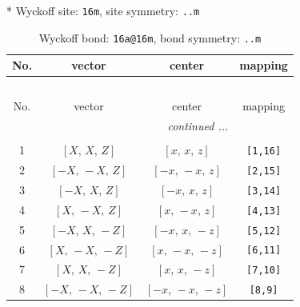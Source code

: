 \documentclass[fleqn,8pt]{jsarticle}
\begin{document}
* Wyckoff site: {\tt 16m}, site symmetry: {\tt ..m}
\renewcommand{\arraystretch}{1.2}
\begin{longtable}{cccc}
\caption{Wyckoff bond: {\tt 16a@16m}, bond symmetry: {\tt ..m}}
 \\
 \hline \hline
No. & vector & center & mapping \\ \hline \endfirsthead

\multicolumn{3}{l}{\tablename\ \thetable{}} \\
 \hline \hline
No. & vector & center & mapping \\ \hline \endhead

 \hline \hline
\multicolumn{3}{r}{\footnotesize\it continued ...} \\ \endfoot

 \hline \hline
\multicolumn{3}{r}{} \\ \endlastfoot

1 & $\left[ X,\, X,\, Z \right]$ & $\left[ x,\, x,\, z \right]$ & {\tt [1,16]} \\ \hline
2 & $\left[ - X,\, - X,\, Z \right]$ & $\left[ - x,\, - x,\, z \right]$ & {\tt [2,15]} \\ \hline
3 & $\left[ - X,\, X,\, Z \right]$ & $\left[ - x,\, x,\, z \right]$ & {\tt [3,14]} \\ \hline
4 & $\left[ X,\, - X,\, Z \right]$ & $\left[ x,\, - x,\, z \right]$ & {\tt [4,13]} \\ \hline
5 & $\left[ - X,\, X,\, - Z \right]$ & $\left[ - x,\, x,\, - z \right]$ & {\tt [5,12]} \\ \hline
6 & $\left[ X,\, - X,\, - Z \right]$ & $\left[ x,\, - x,\, - z \right]$ & {\tt [6,11]} \\ \hline
7 & $\left[ X,\, X,\, - Z \right]$ & $\left[ x,\, x,\, - z \right]$ & {\tt [7,10]} \\ \hline
8 & $\left[ - X,\, - X,\, - Z \right]$ & $\left[ - x,\, - x,\, - z \right]$ & {\tt [8,9]} \\
\end{longtable}
\renewcommand{\arraystretch}{1.2}
\end{document}
